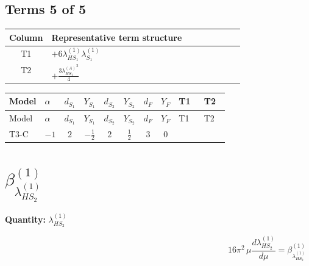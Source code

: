 \documentclass[8pt]{article}
\begin{document}
\begin{landscape}
\subsection*{Terms 5 of 5}
\begin{center}
\begin{tabular}{@{}c >{\raggedright\arraybackslash}p{0.82\linewidth}@{}}
\toprule
Column & Representative term structure \\
\midrule
T1 & \(\displaystyle +6 {\lambda_{HS_1}^{(1)}} {\lambda_{S_1}^{(1)}}\) \\
\midrule
T2 & \(\displaystyle +\frac{3 {\lambda_{HS_1}^{(A)}}^2}{4}\) \\
\midrule
\bottomrule
\end{tabular}
\end{center}
\smallskip
\tiny
\begin{longtable}{@{}llcccccc >{\raggedright\arraybackslash}p{0.21\linewidth} >{\raggedright\arraybackslash}p{0.21\linewidth}@{}}
\toprule
Model & $\alpha$ & $d_{S_1}$ & $Y_{S_1}$ & $d_{S_2}$ & $Y_{S_2}$ & $d_F$ & $Y_F$ & T1 & T2 \\
\midrule
\endfirsthead
\toprule
Model & $\alpha$ & $d_{S_1}$ & $Y_{S_1}$ & $d_{S_2}$ & $Y_{S_2}$ & $d_F$ & $Y_F$ & T1 & T2 \\
\midrule
\endhead
T3-C & $-1$ & $2$ & $-\frac{1}{2}$ & $2$ & $\frac{1}{2}$ & $3$ & $0$ & \scriptsize\adjustbox{max width=\linewidth}{$\begin{gathered} +6 {\lambda_{HS_1}^{(1)}} {\lambda_{S_1}^{(1)}}\end{gathered}$} & \scriptsize\adjustbox{max width=\linewidth}{$\begin{gathered} +\frac{3 {\lambda_{HS_1}^{(A)}}^2}{4}\end{gathered}$} \\
\midrule
\bottomrule
\end{longtable}
\clearpage
\section*{$\beta_{\lambda_{HS_2}^{(1)}}^{(1)}$}
\noindent\textbf{Quantity: }$\lambda_{HS_2}^{(1)}$\par\smallskip
\[16\pi^2\,\mu\frac{d \lambda_{HS_2}^{(1)}}{d\mu}=\beta_{\lambda_{HS_2}^{(1)}}^{(1)}\]

\end{landscape}
\end{document}
